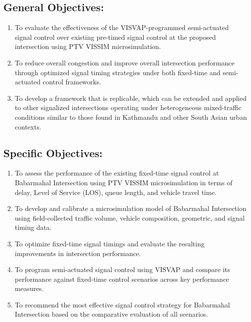\subsection{General Objectives:}


\begin{enumerate}
    \item To evaluate the effectiveness of the VISVAP-programmed semi-actuated signal control over existing pre-timed signal control at the proposed intersection using PTV VISSIM microsimulation.
    \item To reduce overall congestion and improve overall intersection performance through optimized signal timing strategies under both fixed-time and semi-actuated control frameworks.
    \item To develop a framework that is replicable, which can be extended and applied to other signalized intersections operating under heterogeneous mixed-traffic conditions similar to those found in Kathmandu and other South Asian urban contexts.

\end{enumerate}


\subsection{Specific Objectives:}

\begin{enumerate}
    \item To assess the performance of the existing fixed-time signal control at Babarmahal Intersection using PTV VISSIM microsimulation in terms of delay, Level of Service (LOS), queue length, and vehicle travel time.
    \item To develop and calibrate a microsimulation model of Babarmahal Intersection using field-collected traffic volume, vehicle composition, geometric, and signal timing data.
    \item To optimize fixed-time signal timings and evaluate the resulting improvements in intersection performance.
    \item To program semi-actuated signal control using VISVAP and compare its performance against fixed-time control scenarios across key performance measures.
    \item To recommend the most effective signal control strategy for Babarmahal Intersection based on the comparative evaluation of all scenarios.

\end{enumerate}